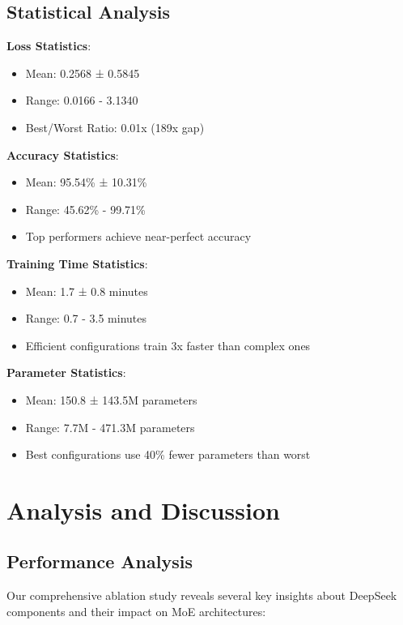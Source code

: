 \documentclass[11pt,a4paper]{article}
\begin{document}
\subsection{Statistical Analysis}

\textbf{Loss Statistics}:
\begin{itemize}
    \item Mean: 0.2568 ± 0.5845
    \item Range: 0.0166 - 3.1340
    \item Best/Worst Ratio: 0.01x (189x gap)
\end{itemize}

\textbf{Accuracy Statistics}:
\begin{itemize}
    \item Mean: 95.54\% ± 10.31\%
    \item Range: 45.62\% - 99.71\%
    \item Top performers achieve near-perfect accuracy
\end{itemize}

\textbf{Training Time Statistics}:
\begin{itemize}
    \item Mean: 1.7 ± 0.8 minutes
    \item Range: 0.7 - 3.5 minutes
    \item Efficient configurations train 3x faster than complex ones
\end{itemize}

\textbf{Parameter Statistics}:
\begin{itemize}
    \item Mean: 150.8 ± 143.5M parameters
    \item Range: 7.7M - 471.3M parameters
    \item Best configurations use 40\% fewer parameters than worst
\end{itemize}


\section{Analysis and Discussion}

\subsection{Performance Analysis}

Our comprehensive ablation study reveals several key insights about DeepSeek components and their impact on MoE architectures:
\end{document}
